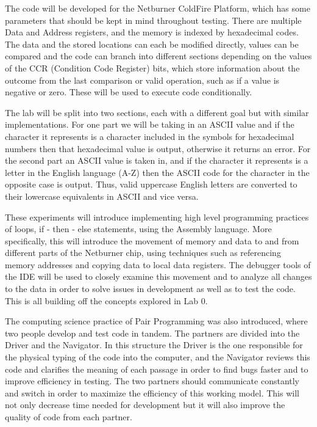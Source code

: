 \documentclass[letterpaper]{article}
\begin{document}
  The code will be developed for the Netburner ColdFire Platform, which has some parameters that should
  be kept in mind throughout testing.  There are multiple Data and Address registers, and the memory
  is indexed by hexadecimal codes.  The data and the stored locations can each be modified directly, values
  can be compared and the code can branch into different sections depending on the values of the CCR
  (Condition Code Register) bits,
  which store information about the outcome from the last comparison or valid operation, such as if a
  value is negative or zero.  These will be used to execute code conditionally.

  The lab will be split into two sections, each with a different goal but with similar implementations.
  For one part we will be taking in an ASCII value and if the character it represents is a character
  included in the symbols for hexadecimal numbers then that hexadecimal value is output, otherwise
  it returns an error.  For the second part an ASCII value is taken in, and if the character it represents
  is a letter in the English language (A-Z) then the ASCII code for the character in the opposite case
  is output.  Thus, valid uppercase English letters are converted to their lowercase equivalents in ASCII
  and vice versa.

  These experiments will introduce implementing high level programming practices of loops, if - then - else statements,
  using the Assembly language. More specifically, this will introduce the movement of
  memory and data to and from different parts of the Netburner chip, using techniques such as referencing
  memory addresses and copying data to local data registers.  The debugger tools of the IDE will be used
  to closely examine this movement and to analyze all changes to the data in order to solve issues in
  development as well as to test the code.  This is all building off the concepts explored in Lab 0.

  The computing science practice of Pair Programming was also introduced, where two people
  develop and test code in tandem.  The partners are divided into the Driver and the Navigator.
  In this structure the Driver is the one responsible for the physical typing of the code into the computer,
  and the Navigator reviews this code and clarifies the meaning of each passage in order to find bugs faster
  and to improve efficiency in testing.  The two partners should communicate constantly and switch in order
  to maximize the efficiency of this working model.  This will not only decrease time needed for development
  but it will also improve the quality of code from each partner.
\end{document}

